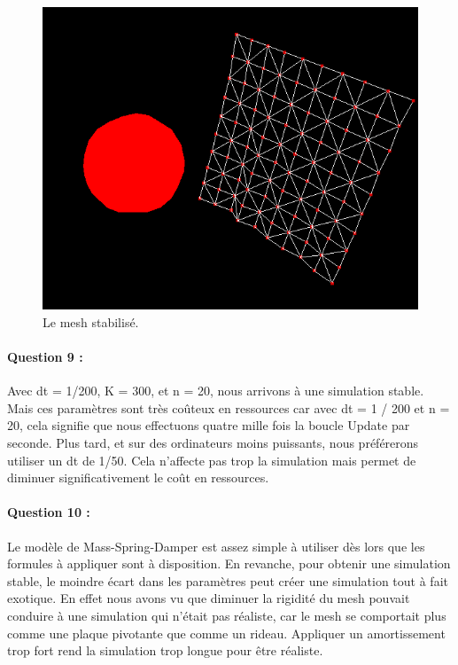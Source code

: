 \documentclass[a4paper,12pt]{article}
\begin{document}
\begin{figure}
  \centering
  \includegraphics{images/rideau_fin.png}
  \caption{Le mesh stabilisé.}
  \label{fig:rideauCode}
\end{figure}

\paragraph{Question 9 :} 	Avec dt = 1/200, K = 300, et n = 20, nous arrivons à une simulation stable. Mais ces paramètres sont très coûteux en ressources car avec dt = 1 / 200 et n = 20, cela signifie que nous effectuons quatre mille fois la boucle \og{}Update\fg{} par seconde. Plus tard, et sur des ordinateurs moins puissants, nous préférerons utiliser un dt de 1/50. Cela n'affecte pas trop la simulation mais permet de diminuer significativement le coût en ressources.

\paragraph{Question 10 :} Le modèle de Mass-Spring-Damper est assez simple à utiliser dès lors que les formules à appliquer sont à disposition. En revanche, pour obtenir une simulation stable, le moindre écart dans les paramètres peut créer une simulation tout à fait exotique. En effet nous avons vu que diminuer la rigidité du mesh pouvait conduire à une simulation qui n'était pas réaliste, car le mesh se comportait plus comme une plaque pivotante que comme un rideau. Appliquer un amortissement trop fort rend la simulation trop longue pour être réaliste.
\end{document}
